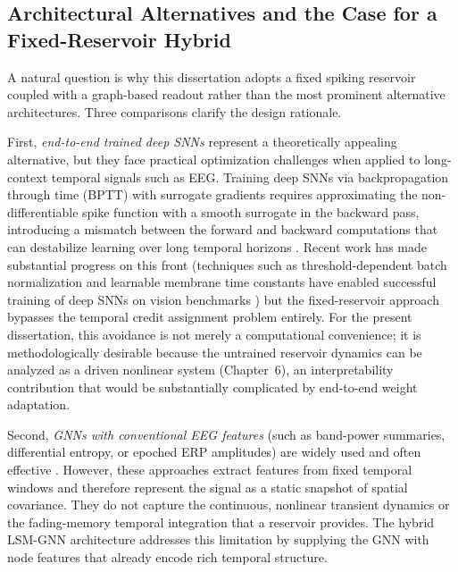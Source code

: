 \subsection{Architectural Alternatives and the Case for a Fixed-Reservoir Hybrid}
\label{sec:architectural_comparison}
A natural question is why this dissertation adopts a fixed spiking reservoir coupled with a graph-based readout rather than the most prominent alternative architectures. Three comparisons clarify the design rationale.

First, \emph{end-to-end trained deep SNNs} represent a theoretically appealing alternative, but they face practical optimization challenges when applied to long-context temporal signals such as EEG. Training deep SNNs via backpropagation through time (BPTT) with surrogate gradients requires approximating the non-differentiable spike function with a smooth surrogate in the backward pass, introducing a mismatch between the forward and backward computations that can destabilize learning over long temporal horizons \cite{neftci_surrogate_2019}. Recent work has made substantial progress on this front (techniques such as threshold-dependent batch normalization and learnable membrane time constants have enabled successful training of deep SNNs on vision benchmarks \cite{zheng_tdbn_2021, fang_plif_2021}) but the fixed-reservoir approach bypasses the temporal credit assignment problem entirely. For the present dissertation, this avoidance is not merely a computational convenience; it is methodologically desirable because the untrained reservoir dynamics can be analyzed as a driven nonlinear system (Chapter~6), an interpretability contribution that would be substantially complicated by end-to-end weight adaptation.

Second, \emph{GNNs with conventional EEG features} (such as band-power summaries, differential entropy, or epoched ERP amplitudes) are widely used and often effective \cite{Jia2024GNNEEGSentiment}. However, these approaches extract features from fixed temporal windows and therefore represent the signal as a static snapshot of spatial covariance. They do not capture the continuous, nonlinear transient dynamics or the fading-memory temporal integration that a reservoir provides. The hybrid LSM-GNN architecture addresses this limitation by supplying the GNN with node features that already encode rich temporal structure.

